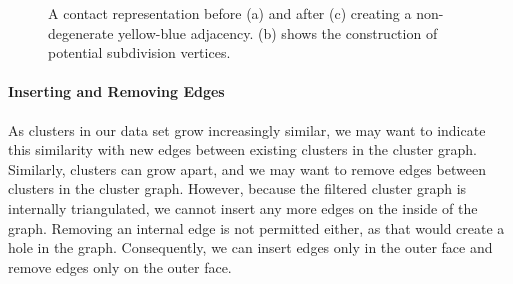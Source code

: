 \begin{figure}[H]
	\centering
	\quad
	\quad
	\caption{A contact representation before (a) and after (c) creating a non-degenerate yellow-blue adjacency. (b) shows the construction of potential subdivision vertices.}
	\label{fig:flip-edge-create-boundary}
\end{figure}



\paragraph{Inserting and Removing Edges}

As clusters in our data set grow increasingly similar, we may want to indicate this similarity with new edges between existing clusters in the cluster graph.
Similarly, clusters can grow apart, and we may want to remove edges between clusters in the cluster graph.
However, because the filtered cluster graph is internally triangulated, we cannot insert any more edges on the inside of the graph.
Removing an internal edge is not permitted either, as that would create a hole in the graph.
Consequently, we can insert edges only in the outer face and remove edges only on the outer face.

